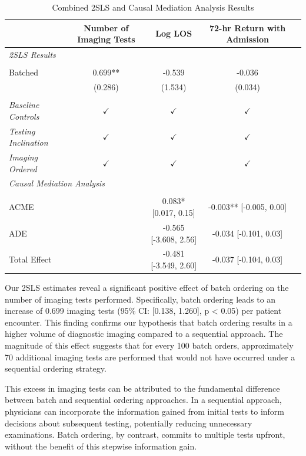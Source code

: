 \documentclass[,,nonblindrev]{informs}
\begin{document}
\begin{table}[!htbp]
\centering
\caption{Combined 2SLS and Causal Mediation Analysis Results}
\label{tab:combined_results}
\begin{threeparttable}
\begin{tabularx}{\textwidth}{Xcccc}
\toprule
& Number of Imaging Tests & Log LOS & 72-hr Return with Admission \\ \cmidrule(l){2-2} \cmidrule(l){3-3} \cmidrule(l){4-5}
\midrule
\multicolumn{5}{l}{\textit{2SLS Results}} \\
\\
Batched & 0.699** & -0.539 & -0.036 & \\
& (0.286) & (1.534) & (0.034) & \\
\\
  \textit{Baseline Controls} &  $\checkmark$ & $\checkmark$ & $\checkmark$ \\ 
  \textit{Testing Inclination} &  $\checkmark$ & $\checkmark$ & $\checkmark$ \\ 
  \textit{Imaging Ordered} & $\checkmark$ & $\checkmark$ & $\checkmark$ \\ 
\midrule
\multicolumn{5}{l}{\textit{Causal Mediation Analysis}} \\
\\
ACME & & 0.083*  [0.017, 0.15] & -0.003**  [-0.005, 0.00] \\
ADE &  & -0.565  [-3.608, 2.56] & -0.034  [-0.101, 0.03] \\
Total Effect &  & -0.481  [-3.549, 2.60] & -0.037  [-0.104, 0.03] \\
\bottomrule
\end{tabularx}
\end{threeparttable}
\end{table}

Our 2SLS estimates reveal a significant positive effect of batch
ordering on the number of imaging tests performed. Specifically, batch
ordering leads to an increase of 0.699 imaging tests (95\% CI: {[}0.138,
1.260{]}, p \textless{} 0.05) per patient encounter. This finding
confirms our hypothesis that batch ordering results in a higher volume
of diagnostic imaging compared to a sequential approach. The magnitude
of this effect suggests that for every 100 batch orders, approximately
70 additional imaging tests are performed that would not have occurred
under a sequential ordering strategy.

This excess in imaging tests can be attributed to the fundamental
difference between batch and sequential ordering approaches. In a
sequential approach, physicians can incorporate the information gained
from initial tests to inform decisions about subsequent testing,
potentially reducing unnecessary examinations. Batch ordering, by
contrast, commits to multiple tests upfront, without the benefit of this
stepwise information gain.
\end{document}
